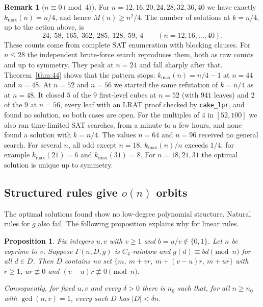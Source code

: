 \documentclass[11pt]{amsart}
\newtheorem{proposition}[theorem]{Proposition}
\theoremstyle{definition}
\newtheorem{remark}[theorem]{Remark}
\newcommand{\M}{M}
\newcommand{\kmax}{k_{\max}}
\begin{document}
\begin{remark}[$n\equiv0\pmod 4$]
For $n=12,16,20,24,28,32,36,40$ we have exactly $\kmax(n)=n/4$, and hence
$\M(n)\ge n^2/4$. The number of solutions at $k=n/4$, up to the action above, is
\[
  24,\ 58,\ 165,\ 362,\ 285,\ 128,\ 59,\ 4 \qquad (n=12,16,\dots,40).
\]
These counts come from complete SAT enumeration with blocking clauses. For $n\le 28$ the
independent brute-force search reproduces them, both as raw counts and up to symmetry. They peak at $n=24$
and fall sharply after that. Theorem~\ref{thm:44} shows that the pattern stops: $\kmax(n)=n/4-1$
at $n=44$ and $n=48$. At $n=52$ and $n=56$ we started the same refutation of $k=n/4$ as at
$n=48$. It closed $5$ of the $9$ first-level cubes at $n=52$ (with $941$ leaves) and $2$ of the
$9$ at $n=56$, every leaf with an LRAT proof checked by \texttt{cake\_lpr}, and found no
solution, so both cases are open. For the multiples of $4$ in $[52,100]$ we also ran
time-limited SAT searches, from a minute to a few hours, and none found a solution with
$k=n/4$. The values $n=64$ and $n=96$ received no general search.
For several $n$, all odd except $n=18$, $\kmax(n)/n$ exceeds $1/4$; for example
$\kmax(21)=6$ and $\kmax(31)=8$. For $n=18,21,31$ the optimal solution is unique up to
symmetry.
\end{remark}

\subsection{Structured rules give $o(n)$ orbits}

The optimal solutions found show no low-degree polynomial structure. Natural rules for $g$
also fail. The following proposition explains why for linear rules.

\begin{proposition}\label{prop:linear}
Fix integers $u,v$ with $v\ge1$ and $b=u/v\notin\{0,1\}$. Let $n$ be coprime to $v$.
Suppose $\Gamma(n,D,g)$ is $C_4$-rainbow and $g(d)\equiv bd\pmod n$ for all $d\in D$.
Then $D$ contains no set $\{m,\ m+vr,\ m+(v-u)r,\ m+ur\}$ with $r\ge1$,
$ur\not\equiv0$ and $(v-u)r\not\equiv0\pmod n$.

Consequently, for fixed $u,v$ and every $\delta>0$ there is $n_0$ such that, for all
$n\ge n_0$ with $\gcd(n,v)=1$, every such $D$ has $|D|<\delta n$.
\end{proposition}
\end{document}
